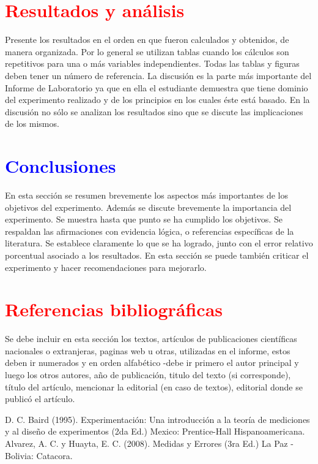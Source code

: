 \documentclass[11pt]{article}
\begin{document}
\begin{multicols}{2}
\section{\textbf{\textcolor{red}{Resultados y análisis}}}
\noindent Presente los resultados en el orden en que fueron calculados y obtenidos, de manera organizada. Por lo general se utilizan tablas cuando los cálculos son repetitivos para una o más variables independientes. Todas las tablas y figuras deben tener un número de referencia. La discusión es la parte más importante del Informe de Laboratorio ya que en ella el estudiante demuestra que tiene dominio del experimento realizado y de los principios en los cuales éste está basado. En la discusión no sólo se analizan los resultados sino que se discute las implicaciones de los mismos.
\section{\textbf{\textcolor{blue}{Conclusiones}}}
\noindent En esta sección se resumen brevemente los aspectos más importantes de los objetivos del experimento. Además se discute brevemente la importancia del experimento. Se muestra hasta que punto se ha cumplido los objetivos. Se respaldan las afirmaciones con evidencia lógica, o referencias específicas de la literatura. Se establece claramente lo que se ha logrado, junto con el error relativo porcentual asociado a los resultados. En esta sección se puede también criticar el experimento y hacer recomendaciones para mejorarlo.
\section{\textbf{\textcolor{red}{Referencias bibliográficas}}}
\noindent Se debe incluir en esta sección los textos, artículos de publicaciones científicas nacionales o extranjeras, paginas web u otras, utilizadas en el informe, estos deben ir numerados y en orden alfabético -debe ir primero el autor principal y luego los otros autores, año de publicación, titulo del texto (si corresponde), título del artículo, mencionar la editorial (en caso de textos), editorial donde se publicó el artículo. \\
\begin{thebibliography}{10}
 D. C. Baird (1995). Experimentación: Una introducción a la teoría de mediciones y al diseño de experimentos (2da Ed.) Mexico: Prentice-Hall Hispanoamericana.
 Alvarez, A. C. y Huayta, E. C. (2008). Medidas y Errores (3ra Ed.) La Paz - Bolivia: Catacora.
\end{thebibliography}
\end{multicols}
\end{document}
